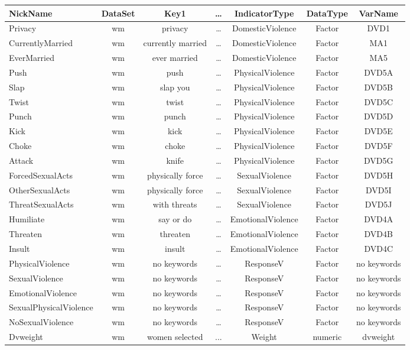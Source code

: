 \documentclass[12pt]{article}
\begin{document}
{\small
	\begin{tabular}{l|c|c|c|c|c|c}
		\hline
NickName	&	DataSet	&	Key1	& … &	IndicatorType	&	DataType	&	VarName	\\
\hline
Privacy	&	wm	&	privacy	& … &	DomesticViolence	&	Factor	&	DVD1	\\
CurrentlyMarried	&	wm	&	currently married	& … &	DomesticViolence	&	Factor	&	MA1	\\
EverMarried	&	wm	&	ever married	& … &	DomesticViolence	&	Factor	&	MA5	\\
Push	&	wm	&	push	& … &	PhysicalViolence	&	Factor	&	DVD5A	\\
Slap	&	wm	&	slap you	& … &	PhysicalViolence	&	Factor	&	DVD5B	\\
Twist	&	wm	&	twist	& … &	PhysicalViolence	&	Factor	&	DVD5C	\\
Punch	&	wm	&	punch	& … &	PhysicalViolence	&	Factor	&	DVD5D	\\
Kick	&	wm	&	kick	& … &	PhysicalViolence	&	Factor	&	DVD5E	\\
Choke	&	wm	&	choke	& … &	PhysicalViolence	&	Factor	&	DVD5F	\\
Attack	&	wm	&	knife	& … &	PhysicalViolence	&	Factor	&	DVD5G	\\
ForcedSexualActs	&	wm	&	physically force	& … &	SexualViolence	&	Factor	&	DVD5H	\\
OtherSexualActs	&	wm	&	physically force	& … &	SexualViolence	&	Factor	&	DVD5I	\\
ThreatSexualActs	&	wm	&	with threats	& … &	SexualViolence	&	Factor	&	DVD5J	\\
Humiliate	&	wm	&	say or do	& … &	EmotionalViolence	&	Factor	&	DVD4A	\\
Threaten	&	wm	&	threaten	& … &	EmotionalViolence	&	Factor	&	DVD4B	\\
Insult	&	wm	&	insult	& … &	EmotionalViolence	&	Factor	&	DVD4C	\\
PhysicalViolence	&	wm	&	no keywords	& … &	ResponseV	&	Factor	&	no keywords	\\
SexualViolence	&	wm	&	no keywords	& … &	ResponseV	&	Factor	&	no keywords	\\
EmotionalViolence	&	wm	&	no keywords	& … &	ResponseV	&	Factor	&	no keywords	\\
SexualPhysicalViolence	&	wm	&	no keywords	& … &	ResponseV	&	Factor	&	no keywords	\\
NoSexualViolence	&	wm	&	no keywords	& … &	ResponseV	&	Factor	&	no keywords	\\
Dvweight &	wm	& women selected & ... & Weight	& numeric &	dvweight \\
		\hline
\end{tabular}
}\\
\end{document}
